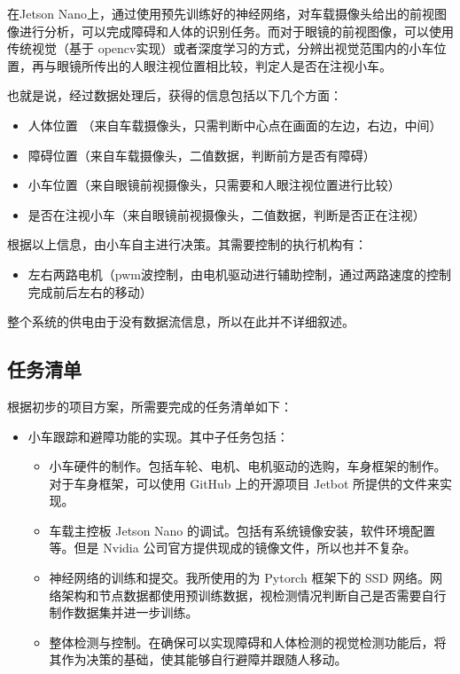 \documentclass{article}
\begin{document}
\begin{spacing}{1.5}
在Jetson Nano上，通过使用预先训练好的神经网络，对车载摄像头给出的前视图像进行分析，可以完成障碍和人体的识别任务。而对于眼镜的前视图像，可以使用传统视觉（基于 opencv实现）或者深度学习的方式，分辨出视觉范围内的小车位置，再与眼镜所传出的人眼注视位置相比较，判定人是否在注视小车。

也就是说，经过数据处理后，获得的信息包括以下几个方面：
\begin{itemize}
    \item 人体位置 （来自车载摄像头，只需判断中心点在画面的左边，右边，中间）
    \item 障碍位置（来自车载摄像头，二值数据，判断前方是否有障碍）
    \item 小车位置（来自眼镜前视摄像头，只需要和人眼注视位置进行比较）
    \item 是否在注视小车（来自眼镜前视摄像头，二值数据，判断是否正在注视）
\end{itemize}

根据以上信息，由小车自主进行决策。其需要控制的执行机构有：

\begin{itemize}
    \item 左右两路电机（pwm波控制，由电机驱动进行辅助控制，通过两路速度的控制完成前后左右的移动）
\end{itemize}

整个系统的供电由于没有数据流信息，所以在此并不详细叙述。

\subsection{任务清单}

根据初步的项目方案，所需要完成的任务清单如下：

\begin{itemize}
    \item 小车跟踪和避障功能的实现。其中子任务包括：

    \begin{itemize}
        \item 小车硬件的制作。包括车轮、电机、电机驱动的选购，车身框架的制作。对于车身框架，可以使用 GitHub 上的开源项目 Jetbot 所提供的文件来实现。
        \item 车载主控板 Jetson Nano 的调试。包括有系统镜像安装，软件环境配置等。但是 Nvidia 公司官方提供现成的镜像文件，所以也并不复杂。
        \item 神经网络的训练和提交。我所使用的为 Pytorch 框架下的 SSD 网络。网络架构和节点数据都使用预训练数据，视检测情况判断自己是否需要自行制作数据集并进一步训练。
        \item 整体检测与控制。在确保可以实现障碍和人体检测的视觉检测功能后，将其作为决策的基础，使其能够自行避障并跟随人移动。
    \end{itemize}


\end{itemize}
\end{spacing}
\end{document}
